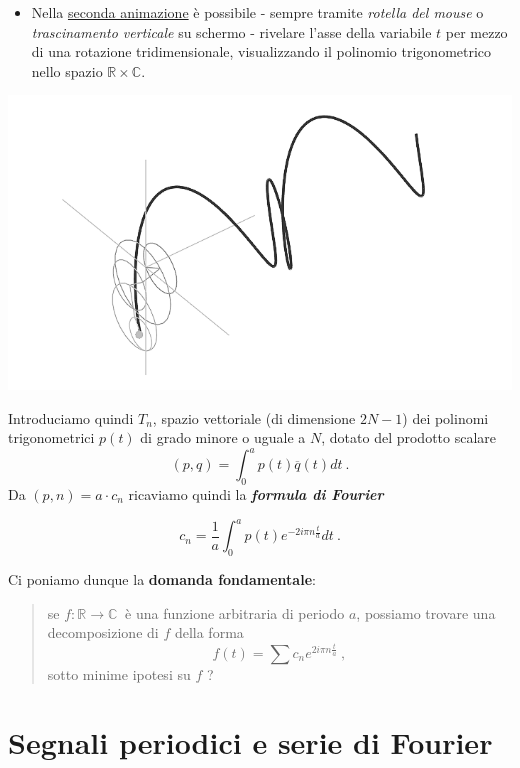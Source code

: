 \documentclass[
]{book}
\providecommand{\tightlist}{%
  \setlength{\itemsep}{0pt}\setlength{\parskip}{0pt}}
\begin{document}
\begin{itemize}
\tightlist
\item
  Nella \href{https://bradwave.github.io/thesis/animations/s3-animation.html}{seconda animazione} è possibile - sempre tramite \emph{rotella del mouse} o \emph{trascinamento verticale} su schermo - rivelare l'asse della variabile \(t\) per mezzo di una rotazione tridimensionale, visualizzando il polinomio trigonometrico nello spazio \(\mathbb{R} \times \mathbb{C}\).
\end{itemize}

\begin{center}\includegraphics[width=0.5\linewidth]{_images/pol-3d} \end{center}

Introduciamo quindi \(T_n\), spazio vettoriale (di dimensione \(2N-1\)) dei polinomi trigonometrici \(p(t)\) di grado minore o uguale a \(N\), dotato del prodotto scalare
\[(p,q) = \int_{0}^{a} p(t) \overline{q}(t)dt \ .\]
Da \((p,n)=a\cdot c_n\) ricaviamo quindi la \emph{\textbf{formula di Fourier}}

\begin{equation}
  c_n=\frac{1}{a} \int_{0}^{a}p(t)e^{-2 i \pi n \textstyle \frac {t}{a}}dt \ .
  \label{eq:formulafourier}
\end{equation}

Ci poniamo dunque la \textbf{domanda fondamentale}:

\begin{quote}
se \(f: \mathbb{R} \longrightarrow \mathbb{C} \ \) è una funzione arbitraria di periodo \(a\), possiamo trovare una decomposizione di \(f\) della forma
\begin{equation}
f(t) = \sum c_n e^{2i \pi n\textstyle \frac{t}{a}} \ ,
\label{eq:domanda}
\end{equation}
sotto minime ipotesi su \(f\) ?
\end{quote}

\hypertarget{seriefourier}{%
\section{Segnali periodici e serie di Fourier}\label{seriefourier}}
\end{document}
